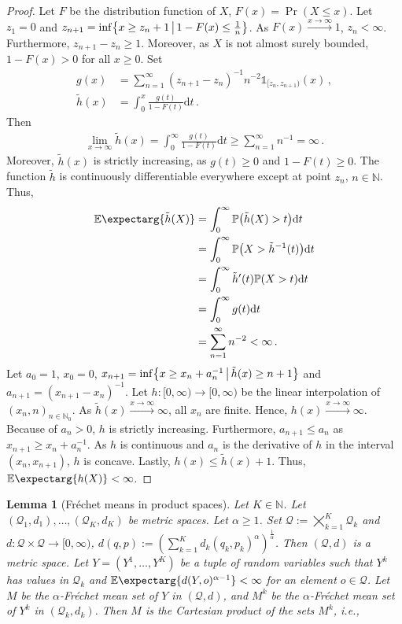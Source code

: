 \documentclass{scrartcl}
\newcommand{\PrOf}[1]{\Pr\mathopen{}\lb #1 \rb\mathclose{}}
\newcommand{\Prof}[1]{\Pr(#1)}
\newcommand{\Ex}{\E\expectarg}
\newcommand*{\mc}[1]{\mathcal{#1}}
\newcommand{\N}{\mathbb{N}}
\newcommand{\pr}{^\prime}
\newcommand{\dl}{\mathrm{d}}
\newcommand{\ind}{\mathds{1}}\newcommand{\indOf}[1]{\ind_{\!#1}}\newcommand{\indOfOf}[2]{\ind_{\!#1}\!\brOf{#2}}\newcommand{\indOfEvent}[1]{\indOf{\cbOf{#1}}}\newcommand{\indOfEventOf}[2]{\indOf{\cbOf{#1}}\!\brOf{#2}}\newcommand{\compl}{^\mathsf{c}}\DeclareMathOperator{\landauO}{\mathcal{O}}\newcommand{\landauOOf}[1]{\landauO\brOf{#1}}\DeclareMathOperator{\landauOmega}{\Omega}\newcommand{\landauOmegaOf}[1]{\landauOmega\brOf{#1}}\DeclareMathOperator{\landauTheta}{\Theta}\newcommand{\landauThetaOf}[1]{\landauTheta\brOf{#1}}\newcommand{\norm}{\left\Vert \cdot \right\Vert}
\newcommand{\equationFullstop}{\, .}
\newcommand{\eqfs}{\equationFullstop}
\newcommand{\equationComma}{\, ,}
\newcommand{\eqcm}{\equationComma}
\theoremstyle{plain}\newtheorem{theorem}{Theorem}[section]
\newtheorem{lemma}[theorem]{Lemma}
\theoremstyle{definition}
\theoremstyle{remark}
\begin{document}
\begin{appendix}
\begin{proof}
	Let $F$ be the distribution function of $X$, $F(x) = \Prof{X \leq x}$.
	Let $z_1 = 0$ and $z_{n+1} = \inf \mathopen{}\left\lbrace x\geq z_n +1 \,\big\vert\, 1-F(x) \leq \frac1n \right\rbrace\mathclose{}$. As $F(x)\xrightarrow{x\to\infty} 1$, $z_n < \infty$. Furthermore, $z_{n+1}-z_n \geq 1$. Moreover, as $X$ is not almost surely bounded, $1-F(x) > 0$ for all $x\geq 0$. Set 
	\begin{align*}
		g(x) &= \sum_{n=1}^\infty (z_{n+1}-z_n)^{-1}n^{-2}\ind_{[z_n, z_{n+1})} (x)
		\eqcm
		\\
		\tilde h(x) &= \int_0^x \frac{g(t)}{1-F(t)} \dl t
		\eqfs
	\end{align*}
	Then
	\begin{align*}
		\lim_{x\to\infty} \tilde h(x) 
		= 
		\int_0^\infty \frac{g(t)}{1-F(t)} \dl t
		\geq
		\sum_{n=1}^\infty n^{-1} 
		= 
		\infty
		\eqfs
	\end{align*}
	Moreover, $\tilde h(x)$ is strictly increasing, as $g(t)\geq 0$ and $1-F(t) \geq 0$.
	The function $\tilde h$ is continuously differentiable everywhere except at point $z_n$, $n\in\N$. Thus,
	\begin{align*}
		\Ex{\tilde h(X)}
		&=
		\int_0^\infty \PrOf{\tilde h(X) > t} \dl t
		\\&=
		\int_0^\infty \PrOf{X > \tilde h^{-1}(t)} \dl t
		\\&=
		\int_0^\infty \tilde h\pr(t) \PrOf{X > t} \dl t
		\\&=
		\int_0^\infty g(t) \dl t
		\\&=
		\sum_{n=1}^\infty n^{-2}
		<
		\infty
		\eqfs
	\end{align*}
	Let $a_0 = 1$, $x_0=0$, $x_{n+1} = \inf\mathopen{}\left\lbrace x \geq x_n + a_n^{-1} \,\big\vert\, \tilde h(x) \geq n+1 \right\rbrace\mathclose{}$ and $a_{n+1} = (x_{n+1} - x_n)^{-1}$. Let $h \colon [0,\infty) \to [0,\infty)$ be the linear interpolation of $(x_n, n)_{n\in\N_0}$. 
	As $\tilde h(x) \xrightarrow{x\to\infty}\infty$, all $x_n$ are finite. Hence, $h(x) \xrightarrow{x\to\infty}\infty$. 
	Because of $a_n > 0$, $h$ is strictly increasing.
	Furthermore, $a_{n+1} \leq a_n$ as $x_{n+1} \geq x_n + a_n^{-1}$. As $h$ is continuous and $a_n$ is the derivative of $h$ in the interval $(x_n, x_{n+1})$, $h$ is concave. 
	Lastly, $h(x) \leq \tilde h(x) + 1$. Thus, $\Ex{h(X)} < \infty$.
\end{proof}
 \begin{lemma}[Fréchet means in product spaces]\label{lmm:products}
Let $K\in\N$. Let $(\mc Q_1, d_1), \dots, (\mc Q_K, d_K)$ be metric spaces. 
Let $\alpha\geq1$.
Set $\mc Q := \bigtimes_{k=1}^K \mc  Q_k$ and $d \colon \mc Q \times \mc Q \to [0,\infty)$, $d(q,p) := (\sum_{k=1}^K d_k(q_k, p_k)^\alpha)^\frac1\alpha$. Then $(\mc Q, d)$ is a metric space. Let $Y = (Y^1, \dots, Y^K)$ be a tuple of random variables such that $Y^k$ has values in $\mc Q_k$ and $\Ex{d(Y,o)^{\alpha-1}} < \infty$ for an element $o\in\mc Q$. Let $M$ be the $\alpha$-Fréchet mean set of $Y$ in $(\mc Q, d)$, and $M^k$ be the $\alpha$-Fréchet mean set of $Y^k$ in $(\mc Q_k, d_k)$. Then $M$ is the Cartesian product of the sets $M^k$, i.e.,

\end{lemma}
\end{appendix}
\end{document}
